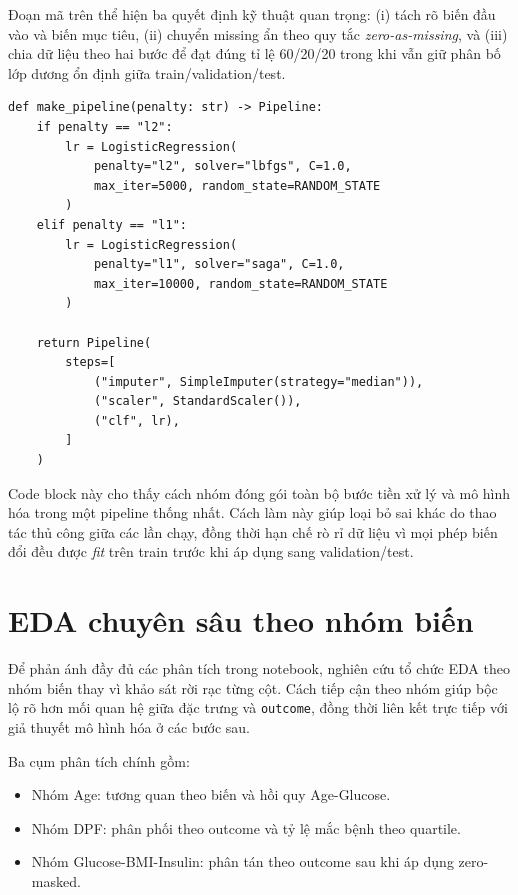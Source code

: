 \noindent
Đoạn mã trên thể hiện ba quyết định kỹ thuật quan trọng: (i) tách rõ biến đầu vào và biến mục tiêu,
(ii) chuyển missing ẩn theo quy tắc \textit{zero-as-missing}, và (iii) chia dữ liệu theo hai bước để đạt đúng tỉ lệ 60/20/20
trong khi vẫn giữ phân bố lớp dương ổn định giữa train/validation/test.

\begin{lstlisting}[caption={Định nghĩa pipeline baseline (imputer + scaler + Logistic Regression)}]
def make_pipeline(penalty: str) -> Pipeline:
    if penalty == "l2":
        lr = LogisticRegression(
            penalty="l2", solver="lbfgs", C=1.0,
            max_iter=5000, random_state=RANDOM_STATE
        )
    elif penalty == "l1":
        lr = LogisticRegression(
            penalty="l1", solver="saga", C=1.0,
            max_iter=10000, random_state=RANDOM_STATE
        )

    return Pipeline(
        steps=[
            ("imputer", SimpleImputer(strategy="median")),
            ("scaler", StandardScaler()),
            ("clf", lr),
        ]
    )
\end{lstlisting}

\noindent
Code block này cho thấy cách nhóm đóng gói toàn bộ bước tiền xử lý và mô hình hóa trong một pipeline thống nhất.
Cách làm này giúp loại bỏ sai khác do thao tác thủ công giữa các lần chạy, đồng thời hạn chế rò rỉ dữ liệu vì mọi phép biến đổi
đều được \textit{fit} trên train trước khi áp dụng sang validation/test.

\section{EDA chuyên sâu theo nhóm biến}
Để phản ánh đầy đủ các phân tích trong notebook, nghiên cứu tổ chức EDA theo nhóm biến thay vì khảo sát rời rạc từng cột.
Cách tiếp cận theo nhóm giúp bộc lộ rõ hơn mối quan hệ giữa đặc trưng và \texttt{outcome}, đồng thời liên kết trực tiếp
với giả thuyết mô hình hóa ở các bước sau.

Ba cụm phân tích chính gồm:
\begin{itemize}[leftmargin=1.5em]
    \item Nhóm Age: tương quan theo biến và hồi quy Age-Glucose.
    \item Nhóm DPF: phân phối theo outcome và tỷ lệ mắc bệnh theo quartile.
    \item Nhóm Glucose-BMI-Insulin: phân tán theo outcome sau khi áp dụng zero-masked.
\end{itemize}

